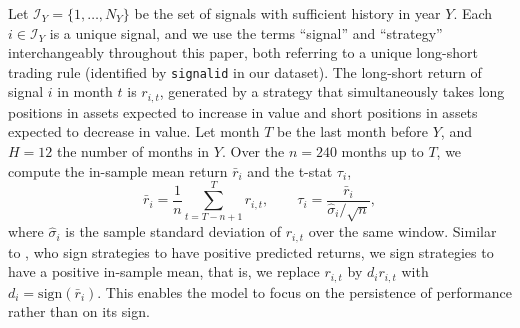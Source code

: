 \documentclass[pdflatex,sn-mathphys-num]{sn-jnl}%
\theoremstyle{thmstyleone}%
\theoremstyle{thmstyletwo}%
\theoremstyle{thmstylethree}%
\begin{document}
Let $\mathcal{I}_Y = \{1, \ldots, N_Y\}$ be the set of signals with sufficient history in year $Y$. Each $i \in \mathcal{I}_Y$ is a unique signal, and we use the terms ``signal'' and ``strategy'' interchangeably throughout this paper, both referring to a unique long-short trading rule (identified by \texttt{signalid} in our dataset). The long-short return of signal $i$ in month $t$ is $r_{i,t}$, generated by a strategy that simultaneously takes long positions in assets expected to increase in value and short positions in assets expected to decrease in value. Let month $T$ be the last month before $Y$, and $H = 12$ the number of months in $Y$. Over the $n = 240$ months up to $T$, we compute the in-sample mean return $\bar{r}_i$ and the t-stat $\tau_i$,
\begin{equation}
\bar{r}_i = \frac{1}{n}\sum_{t=T-n+1}^{T} r_{i,t},
\qquad
\tau_i = \frac{\bar{r}_i}{\hat{\sigma}_i / \sqrt{n}},
\label{eq:summary_statistics}
\end{equation}
where $\hat{\sigma}_i$ is the sample standard deviation of $r_{i,t}$ over the same window. Similar to \cite{chen2025highthroughputassetpricing}, who sign strategies to have positive predicted returns, we sign strategies to have a positive in-sample mean, that is, we replace $r_{i,t}$ by $d_i r_{i,t}$ with $d_i = \mathrm{sign}(\bar{r}_i)$. This enables the model to focus on the persistence of performance rather than on its sign.
\end{document}
